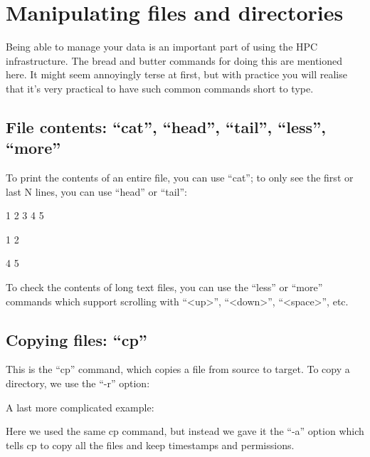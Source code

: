 \chapter{Manipulating files and directories}

Being able to manage your data is an important part of using the HPC
infrastructure.  The bread and butter commands for doing this are mentioned
here.  It might seem annoyingly terse at first, but with practice you will
realise that it's very practical to have such common commands short to type.

\section{File contents: ``cat'', ``head'', ``tail'', ``less'', ``more''}

To print the contents of an entire file, you can use ``cat''; to only see the
first or last N lines, you can use ``head'' or ``tail'':

\begin{prompt}
1
2
3
4
5

1
2

4
5
\end{prompt}

To check the contents of long text files, you can use the ``less'' or ``more''
commands which support scrolling with ``<up>'', ``<down>'', ``<space>'', etc.

\section{Copying files: ``cp''}

\begin{prompt}
\end{prompt}

This is the ``cp'' command, which copies a file from source to target. To copy a directory, we use the ``-r'' option:

\begin{prompt}
\end{prompt}

A last more complicated example:
\begin{prompt}
\end{prompt}

Here we used the same cp command, but instead we gave it the ``-a'' option
which tells cp to copy all the files and keep timestamps and permissions.

